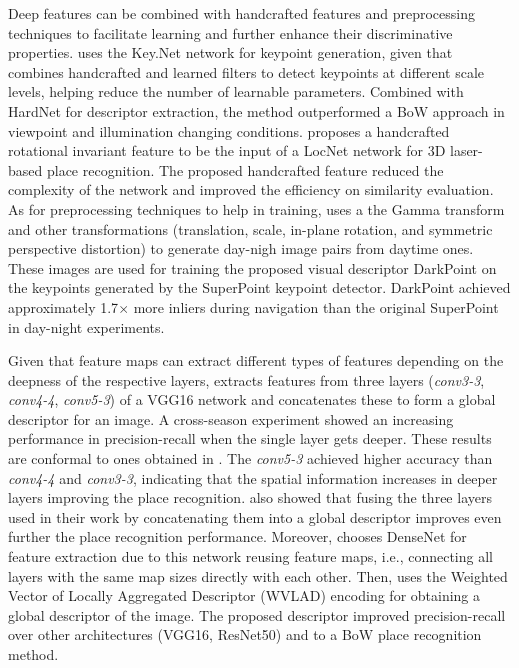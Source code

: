 Deep features can be combined with handcrafted features and preprocessing techniques to facilitate learning and further enhance their discriminative properties.
\cite{zhang-et-al:2022:3086822} uses the Key.Net network for keypoint generation, given that combines handcrafted and learned filters to detect keypoints at different scale levels, helping reduce the number of learnable parameters. Combined with HardNet for descriptor extraction, the method outperformed a BoW approach in viewpoint and illumination changing conditions.
\cite{yin-et-al:2020:2905046} proposes a handcrafted rotational invariant feature to be the input of a LocNet network for 3D laser-based place recognition. The proposed handcrafted feature reduced the complexity of the network and improved the efficiency on similarity evaluation.
As for preprocessing techniques to help in training, \cite{sun-et-al:2021:9635886} uses a the Gamma transform and other transformations (translation, scale, in-plane rotation, and symmetric perspective distortion) to generate day-nigh image pairs from daytime ones. These images are used for training the proposed visual descriptor DarkPoint on the keypoints generated by the SuperPoint keypoint detector. DarkPoint achieved approximately 1.7$\times$ more inliers during navigation than the original SuperPoint in day-night experiments.

Given that feature maps can extract different types of features depending on the deepness of the respective layers, \cite{zhu-et-al:2018:8500686} extracts features from three layers (\textit{conv3-3}, \textit{conv4-4}, \textit{conv5-3}) of a VGG16 network and concatenates these to form a global descriptor for an image. A cross-season experiment showed an increasing performance in precision-recall when the single layer gets deeper.
These results are conformal to ones obtained in \cite{yang-et-al:2021:12054}. The \textit{conv5-3} achieved higher accuracy than \textit{conv4-4} and \textit{conv3-3}, indicating that the spatial information increases in deeper layers improving the place recognition. \cite{zhu-et-al:2018:8500686} also showed that fusing the three layers used in their work by concatenating them into a global descriptor improves even further the place recognition performance.
Moreover, \cite{yu-et-al:2019:8961714} chooses DenseNet for feature extraction due to this network reusing feature maps, i.e., connecting all layers with the same map sizes directly with each other. Then, \cite{yu-et-al:2019:8961714} uses the Weighted Vector of Locally Aggregated Descriptor (WVLAD) encoding for obtaining a global descriptor of the image. The proposed descriptor improved precision-recall over other architectures (VGG16, ResNet50) and to a BoW place recognition method.

